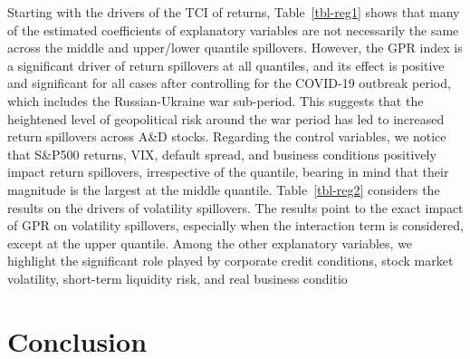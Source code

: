 \documentclass[
  letterpaper,
  DIV=11,
  numbers=noendperiod]{scrartcl}
\begin{document}
Starting with the drivers of the TCI of returns, Table~\ref{tbl-reg1}
shows that many of the estimated coefficients of explanatory variables
are not necessarily the same across the middle and upper/lower quantile
spillovers. However, the GPR index is a significant driver of return
spillovers at all quantiles, and its effect is positive and significant
for all cases after controlling for the COVID-19 outbreak period, which
includes the Russian-Ukraine war sub-period. This suggests that the
heightened level of geopolitical risk around the war period has led to
increased return spillovers across A\&D stocks. Regarding the control
variables, we notice that S\&P500 returns, VIX, default spread, and
business conditions positively impact return spillovers, irrespective of
the quantile, bearing in mind that their magnitude is the largest at the
middle quantile. Table~\ref{tbl-reg2} considers the results on the
drivers of volatility spillovers. The results point to the exact impact
of GPR on volatility spillovers, especially when the interaction term is
considered, except at the upper quantile. Among the other explanatory
variables, we highlight the significant role played by corporate credit
conditions, stock market volatility, short-term liquidity risk, and real
business conditio

\hypertarget{conclusion}{%
\section{Conclusion}\label{conclusion}}
\end{document}
